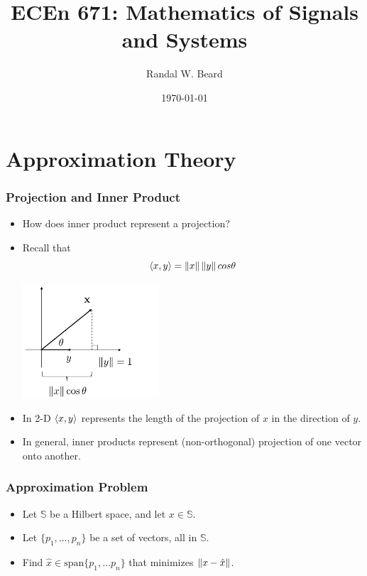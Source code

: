 \documentclass{beamer}
\title{ECEn 671: Mathematics of Signals and Systems}
\author{Randal W. Beard}
\institute{Brigham Young University}
\date{\today}
\begin{document}
\begin{frame}
	\titlepage
\end{frame}


\section{Approximation Theory}
\frame{\sectionpage}


\begin{frame}\frametitle{Projection and Inner Product}
\begin{itemize}
	\item How does inner product represent a projection?
	
	\item Recall that
	\[ 
	\left< x,y\right> = \left\| x \right\|\left\| y \right\| cos \theta 
	\]
	\begin{center}
	\includegraphics[width=2in]{figures/chap3_projection}
	\end{center}
	
	\item In 2-D $\left< x,y\right>$ represents the length of the projection of $x$ in the direction of $y$.

	\item In general, inner products represent (non-orthogonal) projection of one vector onto another.
\end{itemize}
\end{frame}


\begin{frame}\frametitle{Approximation Problem}
	\begin{itemize}
	\item Let $\mathbb{S}$ be a Hilbert space, and let $x \in \mathbb{S}$.

	\item Let $\{p_1, \dots, p_n \}$ be a set of vectors, all in $\mathbb{S}$.
	\item Find $\hat{x} \in \text{span}\{ p_1, \ldots p_n \}$ that minimizes $\left\|x-\hat{x}\right\|$.
	\end{itemize}
\end{frame}
\end{document}
